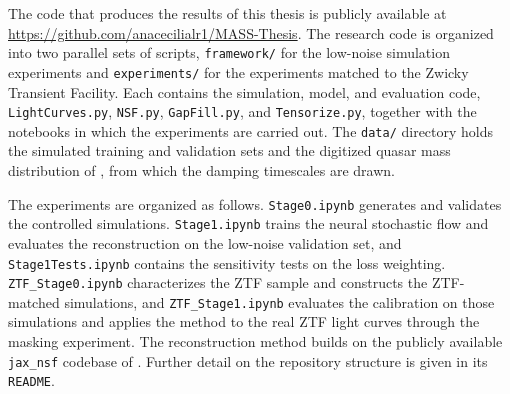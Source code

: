 The code that produces the results of this thesis is publicly available at \url{https://github.com/anacecilialr1/MASS-Thesis}. The research code is organized into two parallel sets of scripts, \texttt{framework/} for the low-noise simulation experiments and \texttt{experiments/} for the experiments matched to the Zwicky Transient Facility. Each contains the simulation, model, and evaluation code, \texttt{LightCurves.py}, \texttt{NSF.py}, \texttt{GapFill.py}, and \texttt{Tensorize.py}, together with the notebooks in which the experiments are carried out. The \texttt{data/} directory holds the simulated training and validation sets and the digitized quasar mass distribution of \textcite{Sun2023QuasarMassDist}, from which the damping timescales are drawn.

The experiments are organized as follows. \texttt{Stage0.ipynb} generates and validates the controlled simulations. \texttt{Stage1.ipynb} trains the neural stochastic flow and evaluates the reconstruction on the low-noise validation set, and \texttt{Stage1Tests.ipynb} contains the sensitivity tests on the loss weighting. \texttt{ZTF\_Stage0.ipynb} characterizes the ZTF sample and constructs the ZTF-matched simulations, and \texttt{ZTF\_Stage1.ipynb} evaluates the calibration on those simulations and applies the method to the real ZTF light curves through the masking experiment. The reconstruction method builds on the publicly available \texttt{jax\_nsf} codebase of \textcite{Kiyohara2025SNF}. Further detail on the repository structure is given in its \texttt{README}.